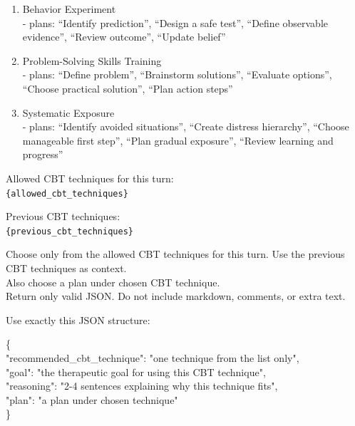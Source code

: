 \begin{tcolorbox}[
    breakable,
    colback=gray!10,
    colframe=gray!40,
    boxrule=0.5pt,
    arc=3mm,
    left=4mm, right=4mm, top=3mm, bottom=3mm
]
\begin{enumerate}[itemsep=4pt,parsep=0pt,topsep=2pt]
    \item Behavior Experiment\\
    - plans: ``Identify prediction'', ``Design a safe test'', ``Define observable evidence'', ``Review outcome'', ``Update belief''
    \item Problem-Solving Skills Training\\
    - plans: ``Define problem'', ``Brainstorm solutions'', ``Evaluate options'', ``Choose practical solution'', ``Plan action steps''
    \item Systematic Exposure\\
    - plans: ``Identify avoided situations'', ``Create distress hierarchy'', ``Choose manageable first step'', ``Plan gradual exposure'', ``Review learning and progress''
\end{enumerate}
\par\medskip

Allowed CBT techniques for this turn:\\
\texttt{\{allowed\_cbt\_techniques\}}

Previous CBT techniques:\\
\texttt{\{previous\_cbt\_techniques\}}

Choose only from the allowed CBT techniques for this turn. Use the previous CBT techniques as context.\\
Also choose a plan under chosen CBT technique.\\
Return only valid JSON. Do not include markdown, comments, or extra text.

Use exactly this JSON structure:

\begingroup
\ttfamily
\{\\
\hspace*{1em}"recommended\_cbt\_technique": "one technique from the list only",\\
\hspace*{1em}"goal": "the therapeutic goal for using this CBT technique",\\
\hspace*{1em}"reasoning": "2-4 sentences explaining why this technique fits",\\
\hspace*{1em}"plan": "a plan under chosen technique"\\
\}
\par
\endgroup
\end{tcolorbox}

\clearpage
{}
{}
\stoptocwriting
